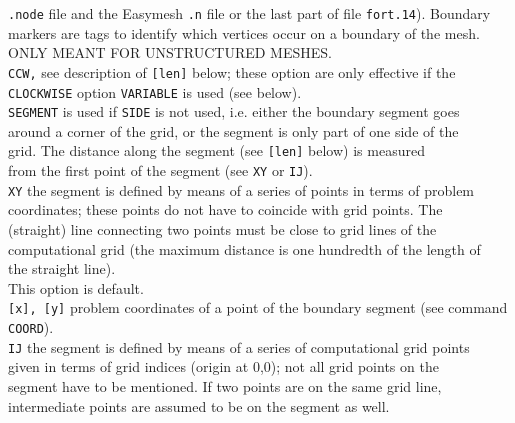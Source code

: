\documentclass[12pt]{book}
\begin{document}
\begin{tabbing}
                        {\tt .node} file and the Easymesh {\tt .n} file or the last part of file {\tt fort.14}). Boundary\\
                        markers are tags to identify which vertices occur on a boundary of the mesh.\\
                        ONLY MEANT FOR UNSTRUCTURED MESHES.\-\\
{\tt CCW,}           \> see description of {\tt [len]} below; these option are only effective if the\\
{\tt CLOCKWISE}      \> option {\tt VARIABLE} is used (see below).\\
{\tt SEGMENT}        \> is used if {\tt SIDE} is not used, i.e. either the boundary segment goes\+\\
                        around a corner of the grid, or the segment is only part of one side of the\\
                        grid. The distance along the segment (see {\tt [len]} below) is measured\\
                        from the first point of the segment (see {\tt XY} or {\tt IJ}).\-\\
{\tt XY}             \> the segment is defined by means of a series of points in terms of problem\+\\
                        coordinates; these points do not have to coincide with grid points. The\\
                        (straight) line connecting two points must be close to grid lines of the\\
                        computational grid (the maximum distance is one hundredth of the length of\\
                        the straight line).\\
                        This option is default.\-\\
{\tt [x], [y]}       \> problem coordinates of a point of the boundary segment (see command {\tt COORD}).\\
{\tt IJ}             \> the segment is defined by means of a series of computational grid points\+\\
                        given in terms of grid indices (origin at 0,0); not all grid points on the\\
                        segment have to be mentioned. If two points are on the same grid line,\\
                        intermediate points are assumed to be on the segment as well.\-\\

\end{tabbing}
\end{document}
